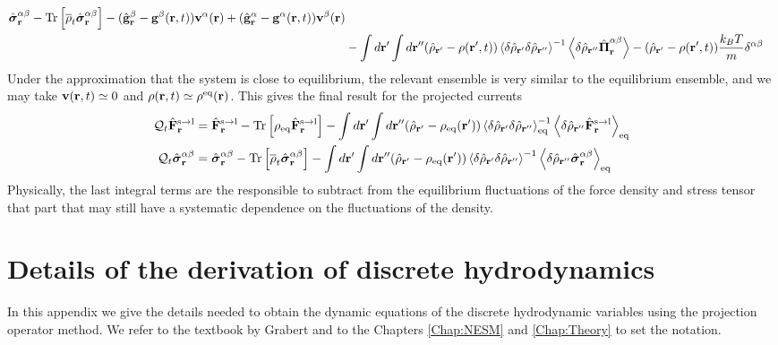 \documentclass[b5paper,openright,11pt]{book}
\newcommand{\llangle}{\left\langle}
\newcommand{\rrangle}{\right\rangle}
\begin{document}
\begin{appendices}
\begin{align}
\hat{\boldsymbol{\sigma}}^{\alpha\beta}_{{\bf r}}-{\rm Tr}\left[\overline{\rho}_t\hat{\boldsymbol{\sigma}}^{\alpha\beta}_{{\bf r}}\right]
-(\hat{\bf g}^\beta_{{\bf r}}-{\bf g}^\beta({\bf r},t))
{\bf v}^\alpha({\bf r})+
(\hat{\bf g}^\alpha_{{\bf r}}-{\bf g}^\alpha({\bf r},t))
{\bf v}^\beta({\bf r})
\nonumber\\
&-\int d{\bf r}'\int d{\bf r}''(\hat{\rho}_{{\bf r}'}-{\rho}({\bf r}',t))
\llangle \delta\hat{\rho}_{{\bf r}'}\delta\hat{\rho}_{{\bf r}''}\rrangle^{-1}
\llangle \delta \hat{\rho}_{{\bf r}''}\hat{\boldsymbol{\Pi}}^{\alpha\beta}_{{\bf r}}\rrangle
-(\hat{\rho}_{{\bf r}'}-\rho({\bf r}',t))\frac{k_BT}{m}\delta^{\alpha\beta}
\label{QFS}
\end{align}
Under the approximation  that the system is close  to equilibrium, the
relevant ensemble is very similar  to the equilibrium ensemble, and we
may  take  ${\bf v}({\bf  r},t)\simeq  0$  and $\rho({\bf  r},t)\simeq
\rho^{\rm eq}({\bf r})$. This gives the final result for the projected
currents
\begin{align}
    {\cal Q}_t\hat{\bf F}^{\rm s\to l}_{{\bf r}}&=
\hat{\bf F}^{\rm s\to l}_{{\bf r}}- {\rm Tr}\left[\rho_{\rm eq}\hat{\bf F}^{\rm s\to l}_{{\bf r}}\right]
-\int d{\bf r}'\int d{\bf r}''(\hat{\rho}_{{\bf r}'}-{\rho}_{\rm eq}({\bf r}'))
\llangle \delta\hat{\rho}_{{\bf r}'}\delta\hat{\rho}_{{\bf r}''}\rrangle_{\rm eq}^{-1}
\llangle \delta \hat{\rho}_{{\bf r}''}\hat{\bf F}^{\rm s\to l}_{{\bf r}}\rrangle_{\rm eq}
\nonumber\\
  {\cal Q}_t\hat{\boldsymbol{\sigma}}^{\alpha\beta}_{{\bf r}}&=
\hat{\boldsymbol{\sigma}}^{\alpha\beta}_{{\bf r}}-{\rm Tr}\left[\overline{\rho}_t\hat{\boldsymbol{\sigma}}^{\alpha\beta}_{{\bf r}}\right]
-\int d{\bf r}'\int d{\bf r}''(\hat{\rho}_{{\bf r}'}-{\rho}_{\rm eq}({\bf r}'))
\llangle \delta\hat{\rho}_{{\bf r}'}\delta\hat{\rho}_{{\bf r}''}\rrangle^{-1}
\llangle \delta \hat{\rho}_{{\bf r}''}\hat{\boldsymbol{\sigma}}^{\alpha\beta}_{{\bf r}}\rrangle_{\rm eq}
\label{QFSeq}
\end{align}
Physically,  the  last integral terms    are  the  responsible  to
subtract from the  equilibrium fluctuations of the  force density and
stress tensor that part that may still have a systematic dependence on
the  fluctuations  of  the  density.  




\chapter{Details of the derivation of discrete hydrodynamics}
\label{Ap:KG}
In this  appendix we  give the  details needed  to obtain  the dynamic
equations of the discrete  hydrodynamic variables using the projection
operator   method.    We   refer   to   the    textbook   by   Grabert
\cite{Grabert1982}  and  to the Chapters \ref{Chap:NESM} and \ref{Chap:Theory} to set  the  notation.

\end{appendices}
\end{document}
